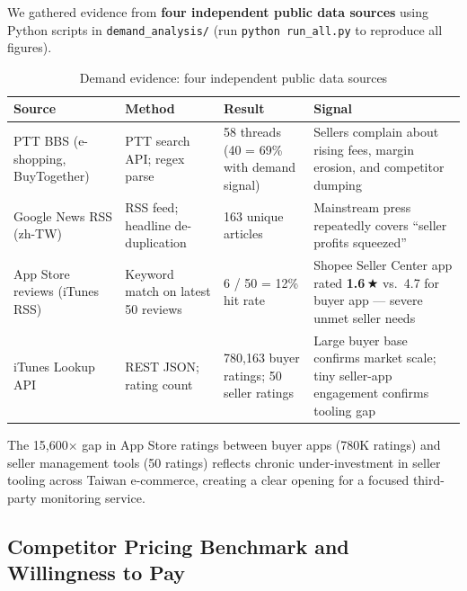 \documentclass[11pt,a4paper]{article}
\begin{document}
We gathered evidence from \textbf{four independent public data sources}
using Python scripts in \texttt{demand\_analysis/} (run
\texttt{python run\_all.py} to reproduce all figures).

\begin{table}[H]
\centering\small\renewcommand{\arraystretch}{1.25}
\begin{tabularx}{\textwidth}{L{3.2cm} L{3.4cm} C{1.6cm} X}
\toprule
\textbf{Source} & \textbf{Method} & \textbf{Result} & \textbf{Signal} \\
\midrule
PTT BBS (e-shopping, BuyTogether)
  & PTT search API; regex parse
  & 58 threads (40 = 69\% with demand signal)
  & Sellers complain about rising fees, margin erosion, and competitor dumping \\
Google News RSS (zh-TW)
  & RSS feed; headline de-duplication
  & 163 unique articles
  & Mainstream press repeatedly covers ``seller profits squeezed'' \\
App Store reviews (iTunes RSS)
  & Keyword match on latest 50 reviews
  & 6 / 50 = 12\% hit rate
  & Shopee Seller Center app rated \textbf{1.6\,$\bigstar$} vs.\ 4.7 for buyer app --- severe unmet seller needs \\
iTunes Lookup API
  & REST JSON; rating count
  & 780,163 buyer ratings; 50 seller ratings
  & Large buyer base confirms market scale; tiny seller-app engagement confirms tooling gap \\
\bottomrule
\end{tabularx}
\caption{Demand evidence: four independent public data sources}
\end{table}

\begin{insightbox}
The 15,600$\times$ gap in App Store ratings between buyer apps (780K ratings)
and seller management tools (50 ratings) reflects chronic under-investment in
seller tooling across Taiwan e-commerce, creating a clear opening for a focused
third-party monitoring service.
\end{insightbox}

\subsection{Competitor Pricing Benchmark and Willingness to Pay}
\end{document}
